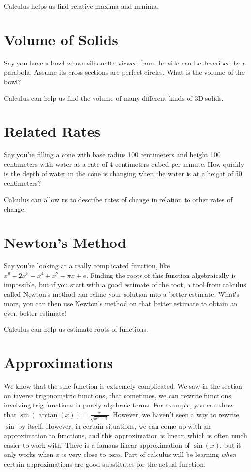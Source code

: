 \documentclass{ximera}
\begin{document}
Calculus helps us find relative maxima and minima.

\section{Volume of Solids}
Say you have a bowl whose silhouette viewed from the side can be described by a parabola. Assume its cross-sections are perfect circles. What is the volume of the bowl? 

Calculus can help us find the volume of many different kinds of 3D solids. 

\section{Related Rates}
Say you're filling a cone with base radius 100 centimeters and height 100 centimeters with water at a rate of 4 centimeters cubed per minute. How quickly is the depth of water in the cone is changing when the water is at a height of 50 centimeters? 

Calculus can allow us to describe rates of change in relation to other rates of change. 

\section{Newton's Method}
Say you're looking at a really complicated function, like $x^6 - 2x^5 - x^4 + x^2 - \pi x + e$. Finding the roots of this function algebraically is impossible, but if you start with a good estimate of the root, a tool from calculus called Newton's method can refine your solution into a better estimate. What's more, you can then use Newton's method on that better estimate to obtain an even better estimate!

Calculus can help us estimate roots of functions. 

\section{Approximations}
We know that the sine function is extremely complicated. We saw in the section on inverse trigonometric functions, that sometimes, we can rewrite functions involving trig functions in purely algebraic terms. For example, you can show that $\sin(\arctan(x)) = \frac{x}{\sqrt{x^2 + 1}}$. However, we haven't seen a way to rewrite $\sin$ by itself. However, in certain situations, we can come up with an approximation to functions, and this approximation is linear, which is often much easier to work with! There is a famous linear approximation of $\sin(x)$, but it only works when $x$ is very close to zero. Part of calculus will be learning \emph{when} certain approximations are good substitutes for the actual function.
\end{document}
